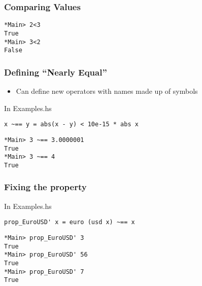\documentclass{beamer}
\begin{document}
\begin{frame}[fragile]
  \frametitle{Comparing Values}
\begin{verbatim}
*Main> 2<3
True
*Main> 3<2
False
\end{verbatim}
\end{frame}
\begin{frame}
  \frametitle{Defining ``Nearly Equal''}
  \begin{itemize}
  \item Can define new operators with names made up of symbols
  \end{itemize}
\begin{block}{In Examples.hs}
\begin{verbatim}
x ~== y = abs(x - y) < 10e-15 * abs x
\end{verbatim}
  \end{block}
\begin{verbatim}
*Main> 3 ~== 3.0000001
True
*Main> 3 ~== 4
True
\end{verbatim}
\end{frame}
\begin{frame}[fragile]
  \frametitle{Fixing the property}
\begin{block}{In Examples.hs}
\begin{verbatim}
prop_EuroUSD' x = euro (usd x) ~== x
\end{verbatim}
  \end{block}
\begin{verbatim}
*Main> prop_EuroUSD' 3
True
*Main> prop_EuroUSD' 56
True
*Main> prop_EuroUSD' 7
True
\end{verbatim}
\end{frame}
\end{document}
